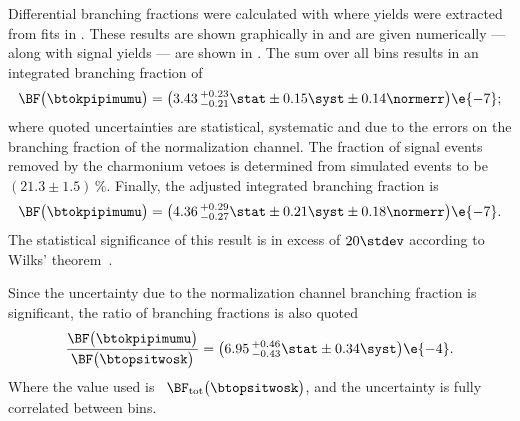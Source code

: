 Differential branching fractions were calculated with  where yields were
extracted from fits in .
These results are shown graphically in  and are given numerically --- along
with signal yields --- are shown in .
The sum over all \qsq bins results in an integrated branching fraction of
\begin{equation*}
  \BF\big( \btokpipimumu \big)=
  \big(3.43\,^{+0.23}_{-0.21}\stat\pm0.15\syst\pm0.14\normerr\big)\e{-7};
\end{equation*}
where quoted uncertainties are statistical, systematic and due to the errors on the branching
fraction of the normalization channel.
The fraction of signal events removed by the charmonium vetoes is determined from simulated
 events %
to be $(21.3\pm1.5)\,\%$.
Finally, the adjusted integrated branching fraction is
\begin{equation*}
  \BF\big( \btokpipimumu \big)=
  \big(4.36\,^{+0.29}_{-0.27}\stat\pm0.21\syst\pm0.18\normerr\big)\e{-7}.
\end{equation*}
The statistical significance of this result is in excess of $20\stdev$ according to Wilks'
theorem~\cite{wilks1938}.

Since the uncertainty due to the normalization channel branching fraction is significant, the
ratio of branching fractions is also quoted
\begin{equation*}
  \frac{ \BF\big( \btokpipimumu \big) }{ \BF\big( \btopsitwosk \big) } =
  \big(6.95\,^{+0.46}_{-0.43}\stat\pm0.34\syst\big)\e{-4}.
\end{equation*}
Where the value used is~\cite{PDG2012}
$\BF_\mathrm{tot}\big(\btopsitwosk\big)$,
and the uncertainty is fully correlated between \qsq bins.


